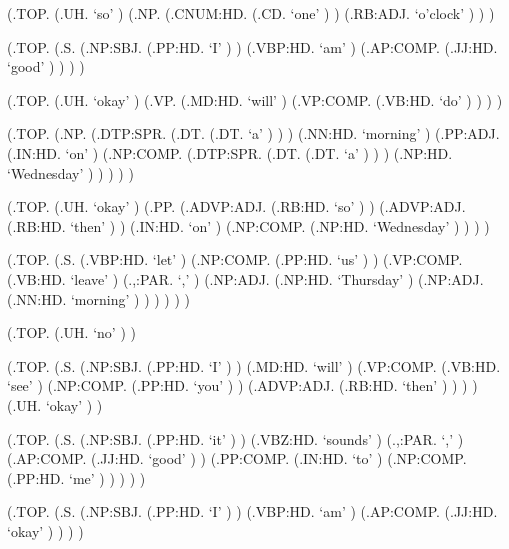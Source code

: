 \documentclass[10pt]{article}
\begin{document}
\begin{parsetree}  (.TOP. (.UH. `so' ) (.NP. (.CNUM:HD. (.CD. `one' ) ) (.RB:ADJ. `o'clock' ) ) ) \end{parsetree}

\begin{parsetree}  (.TOP. (.S. (.NP:SBJ. (.PP:HD. `I' ) ) (.VBP:HD. `am' ) (.AP:COMP. (.JJ:HD. `good' ) ) ) ) \end{parsetree}

\begin{parsetree}  (.TOP. (.UH. `okay' ) (.VP. (.MD:HD. `will' ) (.VP:COMP. (.VB:HD. `do' ) ) ) ) \end{parsetree}

\begin{parsetree}  (.TOP. (.NP. (.DTP:SPR. (.DT. (.DT. `a' ) ) ) (.NN:HD. `morning' ) (.PP:ADJ. (.IN:HD. `on' ) (.NP:COMP. (.DTP:SPR. (.DT. (.DT. `a' ) ) ) (.NP:HD. `Wednesday' ) ) ) ) ) \end{parsetree}

\begin{parsetree}  (.TOP. (.UH. `okay' ) (.PP. (.ADVP:ADJ. (.RB:HD. `so' ) ) (.ADVP:ADJ. (.RB:HD. `then' ) ) (.IN:HD. `on' ) (.NP:COMP. (.NP:HD. `Wednesday' ) ) ) ) \end{parsetree}

\begin{parsetree}  (.TOP. (.S. (.VBP:HD. `let' ) (.NP:COMP. (.PP:HD. `us' ) ) (.VP:COMP. (.VB:HD. `leave' ) (.,:PAR. `,' ) (.NP:ADJ. (.NP:HD. `Thursday' ) (.NP:ADJ. (.NN:HD. `morning' ) ) ) ) ) ) \end{parsetree}

\begin{parsetree}  (.TOP. (.UH. `no' ) ) \end{parsetree}

\begin{parsetree}  (.TOP. (.S. (.NP:SBJ. (.PP:HD. `I' ) ) (.MD:HD. `will' ) (.VP:COMP. (.VB:HD. `see' ) (.NP:COMP. (.PP:HD. `you' ) ) (.ADVP:ADJ. (.RB:HD. `then' ) ) ) ) (.UH. `okay' ) ) \end{parsetree}

\begin{parsetree}  (.TOP. (.S. (.NP:SBJ. (.PP:HD. `it' ) ) (.VBZ:HD. `sounds' ) (.,:PAR. `,' ) (.AP:COMP. (.JJ:HD. `good' ) ) (.PP:COMP. (.IN:HD. `to' ) (.NP:COMP. (.PP:HD. `me' ) ) ) ) ) \end{parsetree}

\begin{parsetree}  (.TOP. (.S. (.NP:SBJ. (.PP:HD. `I' ) ) (.VBP:HD. `am' ) (.AP:COMP. (.JJ:HD. `okay' ) ) ) ) \end{parsetree}
\end{document}

